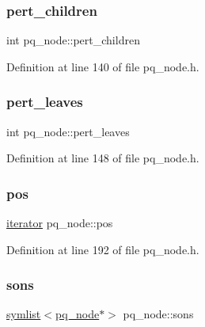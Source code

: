 \subsubsection{\texorpdfstring{pert\+\_\+children}{pert\_children}}
{\footnotesize\ttfamily int pq\+\_\+node\+::pert\+\_\+children\hspace{0.3cm}{\ttfamily [protected]}}



Definition at line 140 of file pq\+\_\+node.\+h.

\mbox{\label{classpq__node_a3fb78609f93f41efd6826ed3169fc312}} 
\subsubsection{\texorpdfstring{pert\+\_\+leaves}{pert\_leaves}}
{\footnotesize\ttfamily int pq\+\_\+node\+::pert\+\_\+leaves\hspace{0.3cm}{\ttfamily [protected]}}



Definition at line 148 of file pq\+\_\+node.\+h.

\mbox{\label{classpq__node_a5e8a5defa0fec4ff2e82fabee97296b4}} 
\subsubsection{\texorpdfstring{pos}{pos}}
{\footnotesize\ttfamily \mbox{\hyperlink{classpq__node_a34898c9eb1527787c07e8ebefd6bfba5}{iterator}} pq\+\_\+node\+::pos\hspace{0.3cm}{\ttfamily [protected]}}



Definition at line 192 of file pq\+\_\+node.\+h.

\mbox{\label{classpq__node_a2cc030cfa4560872acea8b50ebd0542b}} 
\subsubsection{\texorpdfstring{sons}{sons}}
{\footnotesize\ttfamily \mbox{\hyperlink{classsymlist}{symlist}}$<$\mbox{\hyperlink{classpq__node}{pq\+\_\+node}}$\ast$$>$ pq\+\_\+node\+::sons\hspace{0.3cm}{\ttfamily [protected]}}



